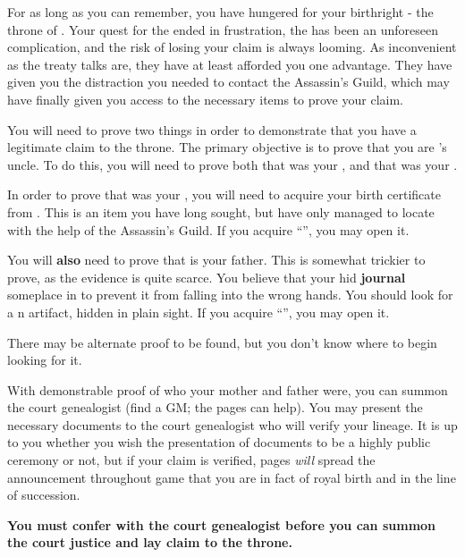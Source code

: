 \documentclass[green]{NeptuneBall}
\begin{document}
\name{\gLineage{}}

For as long as you can remember, you have hungered for your birthright - the throne of \pAtlantis{}.  Your quest for the \iTrident{\MYname} ended in frustration, the \iMusicBox{\MYname} has been an unforeseen complication, and the risk of losing your claim is always looming. 
As inconvenient as the treaty talks are, they have at least afforded you one advantage. They have given you the distraction you needed to contact the Assassin's Guild, which may have finally given you access to the necessary items to prove your claim.

You will need to prove two things in order to demonstrate that you have a legitimate claim to the throne. The primary objective is to prove that you are \cKing{\King} \cKing{}'s uncle. To do this, you will need to prove both that \cMother{} was your \cMother{\parent}, and that \cExExKing{} was your \cExExKing{\parent}.

In order to prove that \cMother{} was your \cMother{\parent}, you will need to acquire your birth certificate from \cDiplomat{}. This is an item you have long sought, but have only managed to locate with the help of the Assassin's Guild. If you acquire ``\iBirthCertificate{}'', you may open it.

You will {\bf also} need to prove that \cExExKing{} is your father. This is somewhat trickier to prove, as the evidence is quite scarce. You believe that your \cMother{\parent} hid {\bf \cMother{\their} journal} someplace in \pAtlantis{} to prevent it from falling into the wrong hands. You should look for a \pPacifica{}n artifact, hidden in plain sight. If you acquire ``\iJournal{}'', you may open it.

There may be alternate proof to be found, but you don't know where to begin looking for it.

With demonstrable proof of who your mother and father were, you can summon the court genealogist (find a GM; the pages can help). You may present the necessary documents to the court genealogist who will verify your lineage. It is up to you whether you wish the presentation of documents to be a highly public ceremony or not, but if your claim is verified, pages \emph{will} spread the announcement throughout game that you are in fact of royal birth and in the line of succession.

{\bf You must confer with the court genealogist before you can summon the court justice and lay claim to the throne.}
\end{document}
